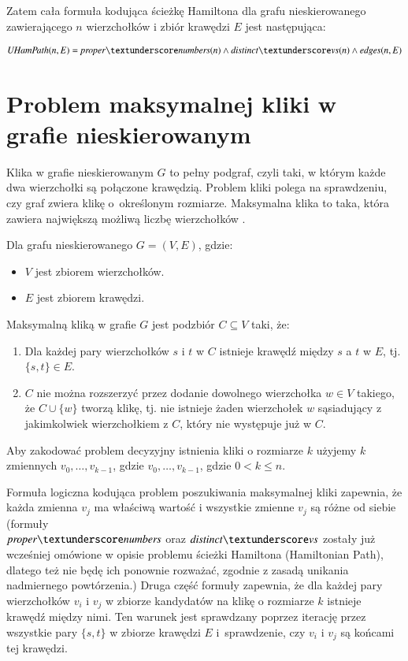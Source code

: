 Zatem cała formuła kodująca ścieżkę Hamiltona dla grafu nieskierowanego zawierającego \(n\) wierzchołków i zbiór krawędzi \(E\) jest następująca:

\begin{align*}
	\UHamPath(n, E) = \propernumbers(n) \land \distinctvs(n) \land \edges(n, E)
\end{align*}


\section{Problem maksymalnej kliki w grafie nieskierowanym}

Klika w grafie nieskierowanym \(G\) to pełny podgraf, czyli taki, w którym każde dwa wierzchołki są połączone krawędzią. Problem kliki polega na sprawdzeniu, czy graf zwiera klikę o~określonym rozmiarze. Maksymalna klika to taka, która zawiera największą możliwą liczbę wierzchołków \cite{Sipser0086373}. 

Dla grafu nieskierowanego $G = (V, E)$, gdzie:
\begin{itemize}
 	\item \(V\) jest zbiorem wierzchołków.
 	\item \(E\) jest zbiorem krawędzi.
\end{itemize}
Maksymalną kliką w grafie \(G\) jest podzbiór $C \subseteq V$ taki, że:
\begin{enumerate}
 	\item Dla każdej pary wierzchołków \(s\) i \(t\) w \(C\) istnieje krawędź między \(s\) a \(t\) w \(E\), tj. $\{s, t\}\in E$. 
 	\item \(C\) nie można rozszerzyć przez dodanie dowolnego wierzchołka $w\in V$ takiego, że $C \cup \{w\}$ tworzą klikę, tj. nie istnieje żaden wierzchołek \(w\) sąsiadujący z jakimkolwiek wierzchołkiem z \(C\), który nie występuje już w \(C\).
\end{enumerate}

Aby zakodować problem decyzyjny istnienia kliki o rozmiarze $k$ użyjemy $k$ zmiennych $v_0,\ldots,v_{k-1}$, gdzie $v_0,\ldots,v_{k-1}$, gdzie $0 < k \leq n$.

Formuła logiczna kodująca problem poszukiwania maksymalnej kliki zapewnia, że każda zmienna \(v_j\) ma właściwą wartość i wszystkie zmienne \(v_j\) są różne od siebie (formuły \\ $\propernumbers$ oraz $\distinctvs$ zostały już wcześniej omówione w opisie problemu ścieżki Hamiltona (Hamiltonian Path), dlatego też nie będę ich ponownie rozważać, zgodnie z zasadą unikania nadmiernego powtórzenia.) Druga część formuły zapewnia, że dla każdej pary wierzchołków \(v_i\) i \(v_j\) w zbiorze kandydatów na klikę o rozmiarze \(k\) istnieje krawędź między nimi. Ten warunek jest sprawdzany poprzez iterację przez wszystkie pary $\{s,t\}$ w zbiorze krawędzi \(E\) i~sprawdzenie, czy \(v_i\) i \(v_j\) są końcami tej krawędzi.

